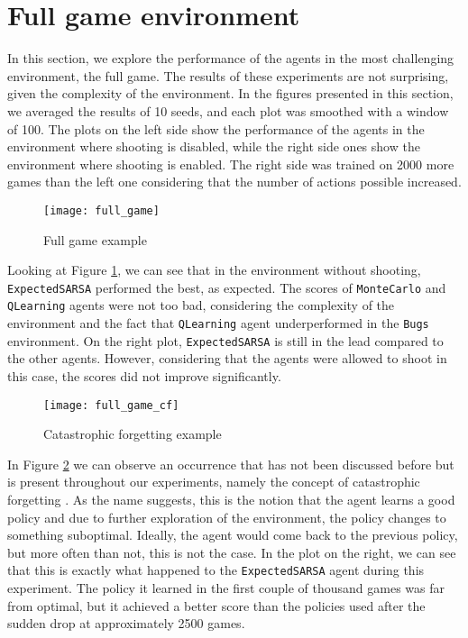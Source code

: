 \section{Full game environment}
In this section, we explore the performance of the agents in the most challenging environment, the full game. The results of these experiments are not surprising, given the complexity of the environment. In the figures presented in this section, we averaged the results of 10 seeds, and each plot was smoothed with a window of 100. The plots on the left side show the performance of the agents in the environment where shooting is disabled, while the right side ones show the environment where shooting is enabled. The right side was trained on 2000 more games than the left one considering that the number of actions possible increased.

\begin{figure}[h]
    \centering
    \texttt{[image: full\_game]}
    \caption{Full game example}
    \label{fig:full_game_eg}
\end{figure}

Looking at Figure \ref{fig:full_game_eg}, we can see that in the environment without shooting, \texttt{ExpectedSARSA} performed the best, as expected. The scores of \texttt{MonteCarlo} and \texttt{QLearning} agents were not too bad, considering the complexity of the environment and the fact that \texttt{QLearning} agent underperformed in the \texttt{Bugs} environment. On the right plot, \texttt{ExpectedSARSA} is still in the lead compared to the other agents. However, considering that the agents were allowed to shoot in this case, the scores did not improve significantly.

\begin{figure}[h]
    \centering
    \texttt{[image: full\_game\_cf]}
    \caption{Catastrophic forgetting example}
    \label{fig:full_game_cf_eg}
\end{figure}

In Figure \ref{fig:full_game_cf_eg} we can observe an occurrence that has not been discussed before but is present throughout our experiments, namely the concept of catastrophic forgetting \cite{russell2010artificial}. As the name suggests, this is the notion that the agent learns a good policy and due to further exploration of the environment, the policy changes to something suboptimal. Ideally, the agent would come back to the previous policy, but more often than not, this is not the case. In the plot on the right, we can see that this is exactly what happened to the \texttt{ExpectedSARSA} agent during this experiment. The policy it learned in the first couple of thousand games was far from optimal, but it achieved a better score than the policies used after the sudden drop at approximately 2500 games.

